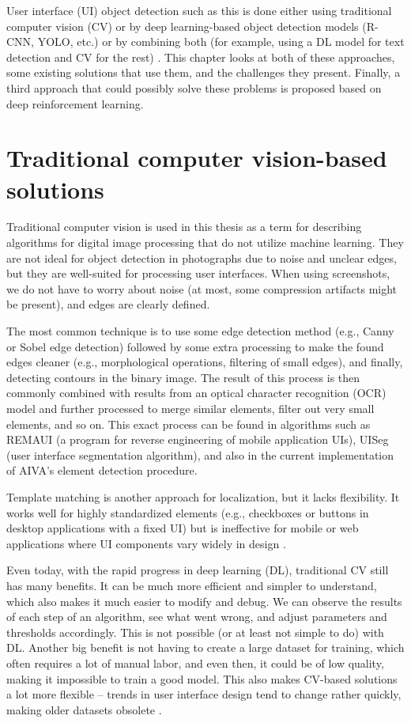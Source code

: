 \documentclass[
  digital,     %
  oneside,     %
  nosansbold,  %
  nocolorbold, %
  lof,         %
  lot,         %
]{fithesis4}
\begin{document}
User interface (UI) object detection such as this is done either using traditional computer vision (CV) or by deep learning-based object detection models (R-CNN, YOLO, etc.) or by combining both (for example, using a DL model for text detection and CV for the rest) \cite{ODforGUI_CV_DL_or_both}. This chapter looks at both of these approaches, some existing solutions that use them, and the challenges they present. Finally, a third approach that could possibly solve these problems is proposed based on deep reinforcement learning.

\section{Traditional computer vision-based solutions}

Traditional computer vision is used in this thesis as a term for describing algorithms for digital image processing that do not utilize machine learning. They are not ideal for object detection in photographs due to noise and unclear edges, but they are well-suited for processing user interfaces. When using screenshots, we do not have to worry about noise (at most, some compression artifacts might be present), and edges are clearly defined.

The most common technique is to use some edge detection method (e.g., Canny or Sobel edge detection) followed by some extra processing to make the found edges cleaner (e.g., morphological operations, filtering of small edges), and finally, detecting contours in the binary image. The result of this process is then commonly combined with results from an optical character recognition (OCR) model and further processed to merge similar elements, filter out very small elements, and so on. This exact process can be found in algorithms such as REMAUI \cite{remaui} (a program for reverse engineering of mobile application UIs), UISeg \cite{uiseg} (user interface segmentation algorithm), and also in the current implementation of AIVA's element detection procedure.

Template matching is another approach for localization, but it lacks flexibility. It works well for highly standardized elements (e.g., checkboxes or buttons in desktop applications with a fixed UI) but is ineffective for mobile or web applications where UI components vary widely in design \cite{ODforGUI_CV_DL_or_both}.

Even today, with the rapid progress in deep learning (DL), traditional CV still has many benefits. It can be much more efficient and simpler to understand, which also makes it much easier to modify and debug. We can observe the results of each step of an algorithm, see what went wrong, and adjust parameters and thresholds accordingly. This is not possible (or at least not simple to do) with DL. Another big benefit is not having to create a large dataset for training, which often requires a lot of manual labor, and even then, it could be of low quality, making it impossible to train a good model. This also makes CV-based solutions a lot more flexible -- trends in user interface design tend to change rather quickly, making older datasets obsolete  \cite{DLvsTCV}.
\end{document}
